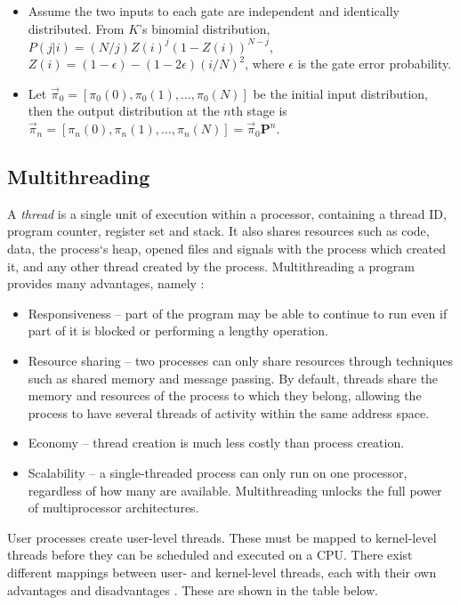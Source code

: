 \begin{itemize}
    \item Assume the two inputs to each gate are independent and identically distributed. From $K$'s binomial distribution, $P(j|i) = 
    (N/j)Z(i)^j(1-Z(i))^{N-j}$, $Z(i) = (1 - \epsilon) - (1 - 2\epsilon)(i/N)^2$, where $\epsilon$ is the gate error probability.

    \item Let $\overrightarrow{\pi}_0 = [\pi_0(0), \pi_0(1), \ldots, \pi_0(N)]$ be the initial input distribution, then the output 
    distribution at the $n$th stage is $\overrightarrow{\pi}_n = [\pi_n(0), \pi_n(1), \ldots, \pi_n(N)] = \overrightarrow{\pi}_0\textbf{P}^n$.

\end{itemize}

\subsection{Multithreading}
\label{sec:bgrw-mult}
A \emph{thread} is a single unit of execution within a processor, containing a thread ID, program counter, register set and stack. It also 
shares resources such as code, data, the process`s heap, opened files and signals with the process which created it, and any other thread 
created by the process. Multithreading a program provides many advantages, namely \cite{os}:
\begin{itemize}
    \item Responsiveness -- part of the program may be able to continue to run even if part of it is blocked or performing a lengthy 
    operation.
    \item Resource sharing -- two processes can only share resources through techniques such as shared memory and message passing. By 
    default, threads share the memory and resources of the process to which they belong, allowing the process to have several threads of 
    activity within the same address space.
    \item Economy -- thread creation is much less costly than process creation.
    \item Scalability -- a single-threaded process can only run on one processor, regardless of how many are available. Multithreading 
    unlocks the full power of multiprocessor architectures.
\end{itemize}

\noindent User processes create user-level threads. These must be mapped to kernel-level threads before they can be scheduled and executed 
on a CPU. There exist different mappings between user- and kernel-level threads, each with their own advantages and disadvantages 
\cite{os}. These are shown in the table below.

